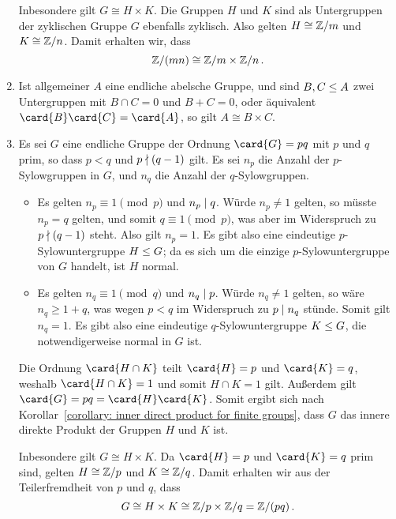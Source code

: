 \begin{example}
\begin{enumerate}
      Inbesondere gilt $G \cong H \times K$.
      Die Gruppen $H$ und $K$ sind als Untergruppen der zyklischen Gruppe $G$ ebenfalls zyklisch.
      Also gelten $H \cong \mathbb{Z}/m$ und $K \cong \mathbb{Z}/n$.
      Damit erhalten wir, dass
      \[
              \mathbb{Z}/(mn)
        \cong \mathbb{Z}/m \times \mathbb{Z}/n \,.
      \]
    \item
      Ist allgemeiner $A$ eine endliche abelsche Gruppe, und sind $B, C \leq A$ zwei Untergruppen mit $B \cap C = 0$ und $B + C = 0$, oder äquivalent $\card{B} \card{C} = \card{A}$, so gilt $A \cong B \times C$.
    \item
      Es sei $G$ eine endliche Gruppe der Ordnung $\card{G} = pq$ mit $p$ und $q$ prim, so dass $p < q$ und $p \mathrel{\nmid} (q-1)$ gilt.
      Es sei $n_p$ die Anzahl der $p$-Sylowgruppen in $G$, und $n_q$ die Anzahl der $q$-Sylowgruppen.
      \begin{itemize}
        \item
          Es gelten $n_p \equiv 1 \pmod{p}$ und $n_p \mathrel{|} q$.
          Würde $n_p \neq 1$ gelten, so müsste $n_p = q$ gelten, und somit $q \equiv 1 \pmod{p}$, was aber im Widerspruch zu $p \mathrel{\nmid} (q-1)$ steht.
          Also gilt $n_p = 1$.
          Es gibt also eine eindeutige $p$-Sylowuntergruppe $H \leq G$;
          da es sich um die einzige $p$-Sylowuntergruppe von $G$ handelt, ist $H$ normal.
        \item
          Es gelten $n_q \equiv 1 \pmod{q}$ und $n_q \mathrel{|} p$.
          Würde $n_q \neq 1$ gelten, so wäre $n_q \geq 1+q$, was wegen $p < q$ im Widerspruch zu $p \mathrel{|} n_q$ stünde.
          Somit gilt $n_q = 1$.
          Es gibt also eine eindeutige $q$-Sylowuntergruppe $K \leq G$, die notwendigerweise normal in $G$ ist.
      \end{itemize}
      Die Ordnung $\card{H \cap K}$ teilt $\card{H} = p$ und $\card{K} = q$, weshalb $\card{H \cap K} = 1$ und somit $H \cap K = 1$ gilt.
      Außerdem gilt $\card{G} = pq = \card{H} \card{K}$.
      Somit ergibt sich nach Korollar~\ref{corollary: inner direct product for finite groups}, dass $G$ das innere direkte Produkt der Gruppen $H$ und $K$ ist.
      
      Inbesondere gilt $G \cong H \times K$.
      Da $\card{H} = p$ und $\card{K} = q$ prim sind, gelten $H \cong \mathbb{Z}/p$ und $K \cong \mathbb{Z}/q$.
      Damit erhalten wir aus der Teilerfremdheit von $p$ und $q$, dass
      \[
              G
        \cong H \times K
        \cong \mathbb{Z}/p \times \mathbb{Z}/q
        =     \mathbb{Z}/(pq) \,.
      \]
      

\end{enumerate}
\end{example}
